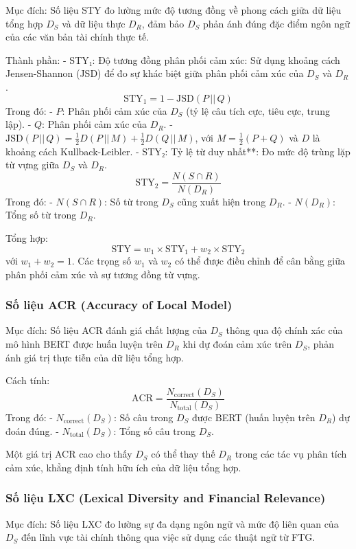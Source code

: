 \documentclass[a4paper,10pt]{article}
\begin{document}
Mục đích: Số liệu STY đo lường mức độ tương đồng về phong cách giữa dữ liệu tổng hợp \( D_S \) và dữ liệu thực \( D_R \), đảm bảo \( D_S \) phản ánh đúng đặc điểm ngôn ngữ của các văn bản tài chính thực tế.

Thành phần:
- STY₁: Độ tương đồng phân phối cảm xúc: Sử dụng khoảng cách Jensen-Shannon (JSD) để đo sự khác biệt giữa phân phối cảm xúc của \( D_S \) và \( D_R \).
  \[
  \text{STY}_1 = 1 - \text{JSD}(P \, || \, Q)
  \]
  Trong đó:
  - \( P \): Phân phối cảm xúc của \( D_S \) (tỷ lệ câu tích cực, tiêu cực, trung lập).
  - \( Q \): Phân phối cảm xúc của \( D_R \).
  - \( \text{JSD}(P \, || \, Q) = \frac{1}{2} D(P \, || \, M) + \frac{1}{2} D(Q \, || \, M) \), với \( M = \frac{1}{2}(P + Q) \) và \( D \) là khoảng cách Kullback-Leibler.
- STY₂: Tỷ lệ từ duy nhất**: Đo mức độ trùng lặp từ vựng giữa \( D_S \) và \( D_R \).
  \[
  \text{STY}_2 = \frac{N(S \cap R)}{N(D_R)}
  \]
  Trong đó:
  - \( N(S \cap R) \): Số từ trong \( D_S \) cũng xuất hiện trong \( D_R \).
  - \( N(D_R) \): Tổng số từ trong \( D_R \).

Tổng hợp:
\[
\text{STY} = w_1 \times \text{STY}_1 + w_2 \times \text{STY}_2
\]
với \( w_1 + w_2 = 1 \). Các trọng số \( w_1 \) và \( w_2 \) có thể được điều chỉnh để cân bằng giữa phân phối cảm xúc và sự tương đồng từ vựng.

\subsubsection{Số liệu ACR (Accuracy of Local Model)} 

Mục đích: Số liệu ACR đánh giá chất lượng của \( D_S \) thông qua độ chính xác của mô hình BERT được huấn luyện trên \( D_R \) khi dự đoán cảm xúc trên \( D_S \), phản ánh giá trị thực tiễn của dữ liệu tổng hợp.

Cách tính:
\[
\text{ACR} = \frac{N_{\text{correct}}(D_S)}{N_{\text{total}}(D_S)}
\]
Trong đó:
- \( N_{\text{correct}}(D_S) \): Số câu trong \( D_S \) được BERT (huấn luyện trên \( D_R \)) dự đoán đúng.
- \( N_{\text{total}}(D_S) \): Tổng số câu trong \( D_S \).

Một giá trị ACR cao cho thấy \( D_S \) có thể thay thế \( D_R \) trong các tác vụ phân tích cảm xúc, khẳng định tính hữu ích của dữ liệu tổng hợp.
\subsubsection{Số liệu LXC (Lexical Diversity and Financial Relevance)
}
Mục đích: Số liệu LXC đo lường sự đa dạng ngôn ngữ và mức độ liên quan của \( D_S \) đến lĩnh vực tài chính thông qua việc sử dụng các thuật ngữ từ FTG.
\end{document}
